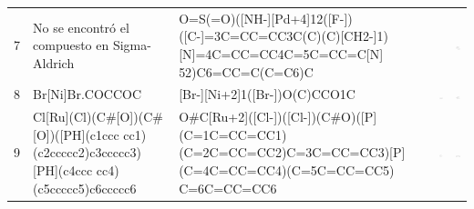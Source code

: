 \begin{landscape}
\begin{longtable}{m{0.3cm}m{6.7cm}m{7.7cm}m{2.3cm}m{2.3cm}}
\\ %

 7 &
 No se encontró el compuesto en Sigma-Aldrich & 
 O=S(=O)([NH-][Pd+4]12([F-])([C-]=3C=CC=CC3C(C)(C)[CH2-]1) [N]=4C=CC=CC4C=5C=CC=C[N] 52)C6=CC=C(C=C6)C & 
 & 
 \includegraphics[width=2.2cm]{imagenes/sciFinder/pdf/Palladium, (2,2-bipyridine-ÎºN1,ÎºN1)[(2,2-dimethyl-1,2-ethanediyl)-1,2-phenylene]fluoro(4-methylbenzenesulfonamidato-ÎºN)-, (OC-6-35).pdf} \\


 8 &
 Br[Ni]Br.COCCOC & 
 [Br-][Ni+2]1([Br-])O(C)CCO1C & 
 \includegraphics[width=2.2cm]{imagenes/sigmaAldrich/Nickel(II) bromide ethylene glycol dimethyl ether complex.png} & 
 \includegraphics[width=2.2cm]{imagenes/sciFinder/pdf/Dibromo(1,2-dimethoxyethane)nickel(II).pdf} \\


 9 &
 Cl[Ru](Cl)(C\#[O])(C\#[O])([PH](c1ccc cc1)(c2ccccc2)c3ccccc3)[PH](c4ccc cc4)(c5ccccc5)c6ccccc6 & 
 O\#C[Ru+2]([Cl-])([Cl-])(C\#O)([P](C=1C=CC=CC1) (C=2C=CC=CC2)C=3C=CC=CC3)[P] (C=4C=CC=CC4)(C=5C=CC=CC5) C=6C=CC=CC6 & 
 \includegraphics[width=2.2cm]{imagenes/sigmaAldrich/Bis(triphenylphosphine)ruthenium(II) dicarbonyl chloride.jpeg} & 
 \includegraphics[width=2.2cm]{imagenes/sciFinder/pdf/Bis(triphenylphosphine)ruthenium(II) dicarbonyl chloride.pdf} \\


\end{longtable}
\end{landscape}

